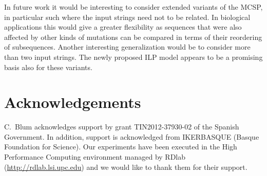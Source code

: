 \documentclass[11pt,a4paper]{article}
\begin{document}
In future work it would be interesting to consider
extended variants of the MCSP, in particular such where the input
strings need not to be related. In biological applications this would
give a greater flexibility as sequences that were also
affected by other kinds of mutations can be compared in terms of their 
reordering of subsequences. Another interesting generalization would be
to consider more than two input strings. The newly proposed ILP model 
appears to be a promising basis also for these variants.


\section*{Acknowledgements}
C.~Blum acknowledges support by grant TIN2012-37930-02 of the Spanish Government. In addition, support is acknowledged from IKERBASQUE (Basque Foundation for Science). Our experiments have been executed in the High Performance Computing environment managed by RDlab (\url{http://rdlab.lsi.upc.edu}) and we would like to thank them for their support.
\end{document}
